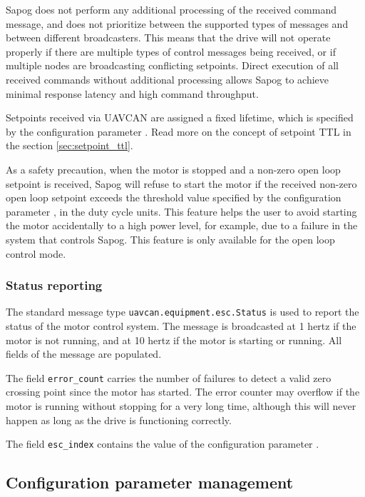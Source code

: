 \documentclass{zubaxdoc}
\begin{document}
Sapog does not perform any additional processing of the received command message,
and does not prioritize between the supported types of messages
and between different broadcasters.
This means that the drive will not operate properly if there are multiple types of control
messages being received, or if multiple nodes are broadcasting conflicting setpoints.
Direct execution of all received commands without additional processing allows Sapog to achieve
minimal response latency and high command throughput.

Setpoints received via UAVCAN are assigned a fixed lifetime, which is specified by the
configuration parameter .
Read more on the concept of setpoint TTL in the section \ref{sec:setpoint_ttl}.

As a safety precaution, when the motor is stopped and a non-zero open loop setpoint is received,
Sapog will refuse to start the motor if the received non-zero open loop setpoint exceeds the
threshold value specified by the configuration parameter ,
in the duty cycle units.
This feature helps the user to avoid starting the motor accidentally to a high power level,
for example, due to a failure in the system that controls Sapog.
This feature is only available for the open loop control mode.

\subsubsection{Status reporting}

The standard message type \verb|uavcan.equipment.esc.Status| is used to report the status of the
motor control system.
The message is broadcasted at 1 hertz if the motor is not running,
and at 10 hertz if the motor is starting or running.
All fields of the message are populated.

The field \verb|error_count| carries the number of failures to detect a valid zero crossing
point since the motor has started.
The error counter may overflow if the motor is running without stopping for a very long time,
although this will never happen as long as the drive is functioning correctly.

The field \verb|esc_index| contains the value of the configuration parameter .

\subsection{Configuration parameter management}
\end{document}
